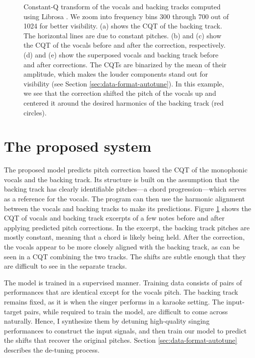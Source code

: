 \begin{figure}[t]
    \caption{
    Constant-Q transform of the vocals and backing tracks computed using Librosa \cite{mcfee2015librosa}. We zoom into frequency bins 300 through 700 out of 1024 for better visibility. (a) shows the CQT of the backing track. The horizontal lines are due to constant pitches. (b) and (c) show the CQT of the vocals before and after the correction, respectively. (d) and (e) show the superposed vocals and backing track before and after corrections. The CQTs are binarized by the mean of their amplitude, which makes the louder components stand out for visibility (see Section \ref{sec:data-format-autotune}). In this example, we see that the correction shifted the pitch of the vocals up and centered it around the desired harmonics of the backing track (red circles).
    }
    \label{fig:model-input-autotune}
\end{figure}

\section{The proposed system}
\label{sec:proposed-autotune}
The proposed model predicts pitch correction based the CQT of the monophonic vocals and the backing track. Its structure is built on the assumption that the backing track has clearly identifiable pitches---a chord progression---which serves as a reference for the vocals. The program can then use the harmonic alignment between the vocals and backing tracks to make its predictions. Figure \ref{fig:model-input-autotune} shows the CQT of vocals and backing track excerpts of a few notes before and after applying predicted pitch corrections. In the excerpt, the backing track pitches are mostly constant, meaning that a chord is likely being held. After the correction, the vocals appear to be more closely aligned with the backing track, as can be seen in a CQT combining the two tracks. The shifts are subtle enough that they are difficult to see in the separate tracks. 

The model is trained in a supervised manner. Training data consists of pairs of performances that are identical except for the vocals pitch. The backing track remains fixed, as it is when the singer performs in a karaoke setting. The input-target pairs, while required to train the model, are difficult to come across naturally. Hence, I synthesize them by detuning high-quality singing performances to construct the input signals, and then train our model to predict the shifts that recover the original pitches. Section \ref{sec:data-format-autotune} describes the de-tuning process.

